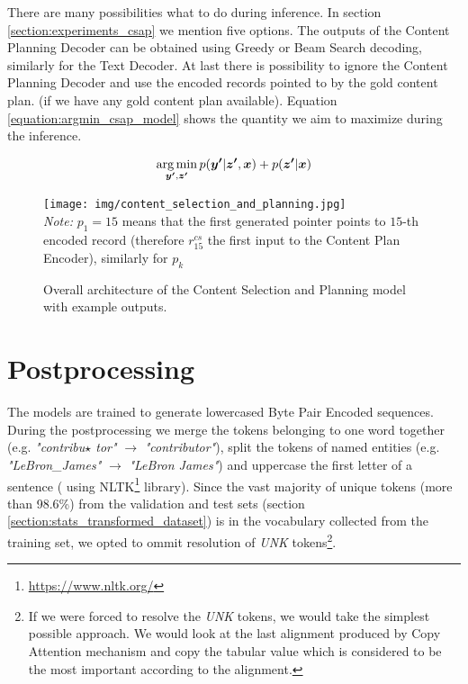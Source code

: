There are many possibilities what to do during inference. In section \ref{section:experiments_csap} we mention five options. The outputs of the Content Planning Decoder can be obtained using Greedy or Beam Search decoding, similarly for the Text Decoder. At last there is possibility to ignore the Content Planning Decoder and use the encoded records pointed to by the gold content plan. (if we have any gold content plan available). Equation \ref{equation:argmin_csap_model} shows the quantity we aim to maximize during the inference.

\begin{equation} \label{equation:argmin_csap_model}
    \operatorname*{arg\,min}_{\boldsymbol{y'}, \boldsymbol{z'}}{p(\boldsymbol{y'}|\boldsymbol{z'}, \boldsymbol{x}) + p(\boldsymbol{z'} | \boldsymbol{x})}
\end{equation}

\begin{figure}[!h]
    \centering
    \texttt{[image: img/content\_selection\_and\_planning.jpg]}
    \footnotesize{\\ \textit{Note:} $p_1 = 15$ means that the first generated pointer points to $15$-th encoded record (therefore $r^{cs}_{15}$ the first input to the Content Plan Encoder), similarly for $p_{k}$}
    \caption{Overall architecture of the Content Selection and Planning model with example outputs.} \label{figure:overal_architecture_csap}
\end{figure}

\section{Postprocessing}

The models are trained to generate lowercased Byte Pair Encoded sequences. During the postprocessing we merge the tokens belonging to one word together (e.g. \emph{"contribu$\star$ tor"} $\rightarrow$ \emph{"contributor"}), split the tokens of named entities (e.g. \emph{"LeBron\_James"} $\rightarrow$ \emph{"LeBron James"}) and uppercase the first letter of a sentence ( using NLTK\footnote{\url{https://www.nltk.org/}} library). Since the vast majority of unique tokens (more than 98.6\%) from the validation and test sets (section \ref{section:stats_transformed_dataset}) is in the vocabulary collected from the training set, we opted to ommit resolution of \emph{UNK} tokens\footnote{If we were forced to resolve the \emph{UNK} tokens, we would take the simplest possible approach. We would look at the last alignment produced by Copy Attention mechanism and copy the tabular value which is considered to be the most important according to the alignment. }.